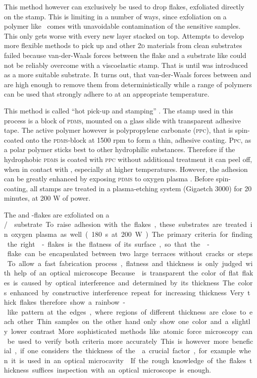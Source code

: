 This method however can exclusively be used to drop \tmdg flakes, exfoliated directly on the stamp. This is limiting in a number of ways, since exfoliation on a polymer like \pdms\ comes with unavoidable contamination of the sensitive samples. This only gets worse with every new layer stacked on top. Attempts to develop more flexible methods to pick up \tmds and other 2\textsc{d} materials from clean substrates failed because van-der-Waals forces between the flake and a substrate like \sio could not be reliably overcome with a viscoelastic stamp. That is until \hbng was introduced as a more suitable substrate. It turns out, that van-der-Waals forces between \hbng and \tmds are high enough to remove them from \sio deterministically while a range of polymers can be used that strongly adhere to \hbng at an appropriate temperature.

This method is called ``hot pick-up and stamping'' \cite{pizzocchero_hot_2016, tien_study_2016}. The stamp used in this process is a block of \textsc{pdms}, mounted on a glass slide with transparent adhesive tape. The active polymer however is polypropylene carbonate (\textsc{ppc}), that is spin-coated onto the \textsc{pdms}-block at 1500 rpm to form a thin, adhesive coating. \textsc{Ppc}, as a polar polymer sticks best to other hydrophilic substances. Therefore if the hydrophobic \textsc{pdms} is coated with \textsc{ppc} without additional treatment it can peel off, when in contact with \sio\!, especially at higher temperatures. However, the adhesion can be greatly enhanced by exposing \textsc{pdms} to oxygen plasma \cite{jung_adhesion_2016}. Before spin-coating, all stamps are treated in a plasma-etching system (Gigaetch 3000) for 20 minutes, at 200 W of power.

The \tmdg and \hbn-flakes are exfoliated on a \si/\sio substrate. To raise adhesion with the flakes, these substrates are treated in oxygen plasma as well (180 s at 200 W). The primary criteria for finding the right \hbn-flakes is the flatness of its surface, so that the \tmd-flake can be encapsulated between two large terraces without cracks or steps. To allow a fast fabrication process, flatness and thickness is only judged with help of an optical microscope. Because \hbng is transparent the color of flat flakes is caused by optical interference and determined by its thickness. The colors enhanced by constructive interference repeat for increasing thickness. Very thick flakes therefore show a rainbow-like pattern at the edges, where regions of different thickness are close to each other. Thin samples on the other hand only show one color and a slightly lower contrast. More sophisticated methods like atomic force microscopy can be used to verify both criteria more accurately. This is however more beneficial, if one considers the thickness of the \hbng a crucial factor, for example when it is used in an optical microcavity  \cite{sidler_fermi_2016}. If the rough knowledge of the flakes thickness suffices inspection with an optical microscope is enough.

